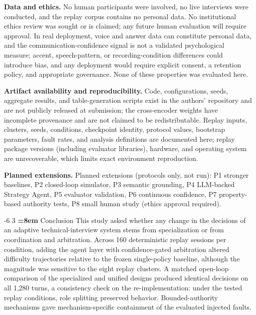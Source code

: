 \documentclass[runningheads,a4paper]{llncs}
\makeatletter
\renewcommand\section{\@startsection{section}{1}{\z@}%
                       {-6\p@ \@plus -1\p@ \@minus -1\p@}%
                       {3\p@ \@plus 1\p@ \@minus 1\p@}%
                       {\normalfont\large\bfseries\boldmath
                        \rightskip=\z@ \@plus 8em\pretolerance=10000 }}
\makeatother
\begin{document}
\textbf{Data and ethics.} No human participants were involved, no live interviews were conducted, and the replay corpus contains no personal data. No institutional ethics review was sought or is claimed; any future human evaluation will require approval. In real deployment, voice and answer data can constitute personal data, and the communication-confidence signal is not a validated psychological measure; accent, speech-pattern, or recording-condition differences could introduce bias, and any deployment would require explicit consent, a retention policy, and appropriate governance. None of these properties was evaluated here.

\textbf{Artifact availability and reproducibility.} Code, configurations, seeds, aggregate results, and table-generation scripts exist in the authors' repository and are not publicly released at submission; the cross-encoder weights have incomplete provenance and are not claimed to be redistributable. Replay inputs, clusters, seeds, conditions, checkpoint identity, protocol values, bootstrap parameters, fault rates, and analysis definitions are documented here; replay package versions (including evaluator libraries), hardware, and operating system are unrecoverable, which limits exact environment reproduction.

\textbf{Planned extensions.} Planned extensions (protocols only, not run): P1 stronger baselines, P2 closed-loop simulator, P3 semantic grounding, P4 LLM-backed Strategy Agent, P5 evaluator validation, P6 continuous confidence, P7 property-based authority tests, P8 small human study (ethics approval required).

\section{Conclusion}
This study asked whether any change in the decisions of an adaptive technical-interview system stems from specialization or from coordination and arbitration. Across 160 deterministic replay sessions per condition, adding the agent layer with confidence-gated arbitration altered difficulty trajectories relative to the frozen single-policy baseline, although the magnitude was sensitive to the eight replay clusters. A matched open-loop comparison of the specialized and unified designs produced identical decisions on all 1,280 turns, a consistency check on the re-implementation: under the tested replay conditions, role splitting preserved behavior. Bounded-authority mechanisms gave mechanism-specific containment of the evaluated injected faults.
\end{document}
